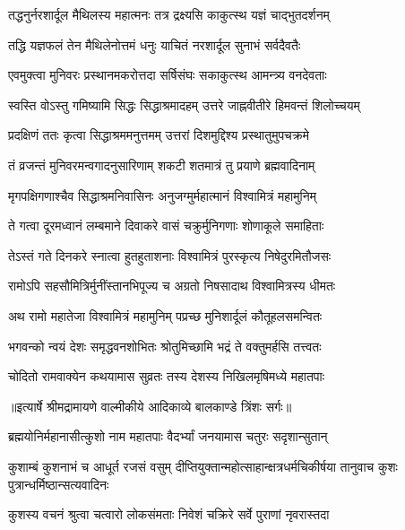 \twolineshloka
{तद्धनुर्नरशार्दूल मैथिलस्य महात्मनः}
{तत्र द्रक्ष्यसि काकुत्स्थ यज्ञं चाद्भुतदर्शनम्} %

\twolineshloka
{तद्धि यज्ञफलं तेन मैथिलेनोत्तमं धनुः}
{याचितं नरशार्दूल सुनाभं सर्वदैवतैः} %

\twolineshloka
{एवमुक्त्वा मुनिवरः प्रस्थानमकरोत्तदा}
{सर्षिसंघः सकाकुत्स्थ आमन्त्र्य वनदेवताः} %

\twolineshloka
{स्वस्ति वोऽस्तु गमिष्यामि सिद्धः सिद्धाश्रमादहम्}
{उत्तरे जाह्नवीतीरे हिमवन्तं शिलोच्चयम्} %

\twolineshloka
{प्रदक्षिणं ततः कृत्वा सिद्धाश्रममनुत्तमम्}
{उत्तरां दिशमुद्दिश्य प्रस्थातुमुपचक्रमे} %

\twolineshloka
{तं व्रजन्तं मुनिवरमन्वगादनुसारिणाम्}
{शकटी शतमात्रं तु प्रयाणे ब्रह्मवादिनाम्} %

\twolineshloka
{मृगपक्षिगणाश्चैव सिद्धाश्रमनिवासिनः}
{अनुजग्मुर्महात्मानं विश्वामित्रं महामुनिम्} %

\twolineshloka
{ते गत्वा दूरमध्वानं लम्बमाने दिवाकरे}
{वासं चक्रुर्मुनिगणाः शोणाकूले समाहिताः} %

\twolineshloka
{तेऽस्तं गते दिनकरे स्नात्वा हुतहुताशनाः}
{विश्वामित्रं पुरस्कृत्य निषेदुरमितौजसः} %

\twolineshloka
{रामोऽपि सहसौमित्रिर्मुनींस्तानभिपूज्य च}
{अग्रतो निषसादाथ विश्वामित्रस्य धीमतः} %

\twolineshloka
{अथ रामो महातेजा विश्वामित्रं महामुनिम्}
{पप्रच्छ मुनिशार्दूलं कौतूहलसमन्वितः} %

\twolineshloka
{भगवन्को न्वयं देशः समृद्धवनशोभितः}
{श्रोतुमिच्छामि भद्रं ते वक्तुमर्हसि तत्त्वतः} %

\twolineshloka
{चोदितो रामवाक्येन कथयामास सुव्रतः}
{तस्य देशस्य निखिलमृषिमध्ये महातपाः} %


{॥इत्यार्षे श्रीमद्रामायणे वाल्मीकीये आदिकाव्ये बालकाण्डे त्रिंशः सर्गः॥}


\twolineshloka
{ब्रह्मयोनिर्महानासीत्कुशो नाम महातपाः}
{वैदर्भ्यां जनयामास चतुरः सदृशान्सुतान्} %

\threelineshloka
{कुशाम्बं कुशनाभं च आधूर्त रजसं वसुम्}
{दीप्तियुक्तान्महोत्साहान्क्षत्रधर्मचिकीर्षया}
{तानुवाच कुशः पुत्रान्धर्मिष्ठान्सत्यवादिनः} %

\twolineshloka
{कुशस्य वचनं श्रुत्वा चत्वारो लोकसंमताः}
{निवेशं चक्रिरे सर्वे पुराणां नृवरास्तदा} %

